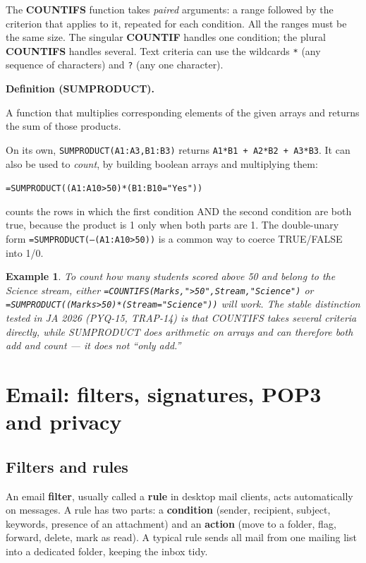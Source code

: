 \documentclass[11pt]{article}
\newtheorem{example}{Example}[section]
\newenvironment{definitionbox}[1]{%
  \par\noindent\textbf{Definition (#1).}\ \itshape
}{\par\vspace{0.3em}}
\begin{document}
The \textbf{COUNTIFS} function takes \emph{paired} arguments: a range followed
by the criterion that applies to it, repeated for each condition. All the
ranges must be the same size. The singular \textbf{COUNTIF} handles one
condition; the plural \textbf{COUNTIFS} handles several. Text criteria can use
the wildcards \texttt{*} (any sequence of characters) and \texttt{?} (any one
character).

\begin{definitionbox}{SUMPRODUCT}
A function that multiplies corresponding elements of the given arrays and
returns the sum of those products.
\end{definitionbox}

On its own, \texttt{SUMPRODUCT(A1:A3,B1:B3)} returns
\texttt{A1*B1 + A2*B2 + A3*B3}. It can also be used to \emph{count}, by
building boolean arrays and multiplying them:

\begin{center}
\texttt{=SUMPRODUCT((A1:A10>50)*(B1:B10="Yes"))}
\end{center}

\noindent counts the rows in which the first condition AND the second
condition are both true, because the product is 1 only when both parts are 1.
The double-unary form \texttt{=SUMPRODUCT(--(A1:A10>50))} is a common way to
coerce TRUE/FALSE into 1/0.

\begin{example}
To count how many students scored above 50 \emph{and} belong to the Science
stream, either
\texttt{=COUNTIFS(Marks,">50",Stream,"Science")} or
\texttt{=SUMPRODUCT((Marks>50)*(Stream="Science"))} will work. The stable
distinction tested in JA 2026 (PYQ-15, TRAP-14) is that COUNTIFS takes several
criteria directly, while SUMPRODUCT does arithmetic on arrays and can
therefore both \emph{add} and \emph{count} --- it does not ``only add.''
\end{example}

\section{Email: filters, signatures, POP3 and privacy}
\subsection*{Filters and rules}
An email \textbf{filter}, usually called a \textbf{rule} in desktop mail
clients, acts automatically on messages. A rule has two parts: a
\textbf{condition} (sender, recipient, subject, keywords, presence of an
attachment) and an \textbf{action} (move to a folder, flag, forward, delete,
mark as read). A typical rule sends all mail from one mailing list into a
dedicated folder, keeping the inbox tidy.
\end{document}
